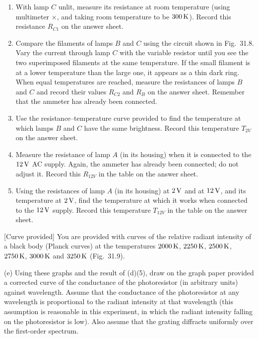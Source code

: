 \begin{enumerate}
\item[(1)] With lamp $C$ unlit, measure its resistance at room temperature (using multimeter $\times$, and taking room temperature to be $300\,\mathrm{K}$). Record this resistance $R_{C1}$ on the answer sheet.
\item[(2)] Compare the filaments of lamps $B$ and $C$ using the circuit shown in Fig.~31.8. Vary the current through lamp $C$ with the variable resistor until you see the two superimposed filaments at the same temperature. If the small filament is at a lower temperature than the large one, it appears as a thin dark ring. When equal temperatures are reached, measure the resistances of lamps $B$ and $C$ and record their values $R_{C2}$ and $R_B$ on the answer sheet. Remember that the ammeter has already been connected.
\item[(3)] Use the resistance--temperature curve provided to find the temperature at which lamps $B$ and $C$ have the same brightness. Record this temperature $T_{2V}$ on the answer sheet.
\item[(4)] Measure the resistance of lamp $A$ (in its housing) when it is connected to the $12\,\mathrm{V}$ AC supply. Again, the ammeter has already been connected; do not adjust it. Record this $R_{12V}$ in the table on the answer sheet.
\item[(5)] Using the resistances of lamp $A$ (in its housing) at $2\,\mathrm{V}$ and at $12\,\mathrm{V}$, and its temperature at $2\,\mathrm{V}$, find the temperature at which it works when connected to the $12\,\mathrm{V}$ supply. Record this temperature $T_{12V}$ in the table on the answer sheet.
\end{enumerate}

[Curve provided] You are provided with curves of the relative radiant intensity of a black body (Planck curves) at the temperatures $2000\,\mathrm{K}$, $2250\,\mathrm{K}$, $2500\,\mathrm{K}$, $2750\,\mathrm{K}$, $3000\,\mathrm{K}$ and $3250\,\mathrm{K}$ (Fig.~31.9).

(e) Using these graphs and the result of (d)(5), draw on the graph paper provided a corrected curve of the conductance of the photoresistor (in arbitrary units) against wavelength. Assume that the conductance of the photoresistor at any wavelength is proportional to the radiant intensity at that wavelength (this assumption is reasonable in this experiment, in which the radiant intensity falling on the photoresistor is low). Also assume that the grating diffracts uniformly over the first-order spectrum.

